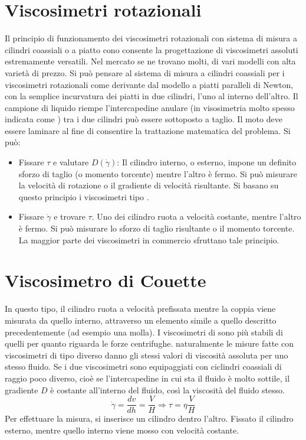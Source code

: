 \section{Viscosimetri rotazionali}
Il principio di funzionamento dei viscosimetri rotazionali con sistema di misura a cilindri coassiali o a piatto cono consente la progettazione di viscosimetri assoluti estremamente versatili.
Nel mercato se ne trovano molti, di vari modelli con alta varietà di prezzo.
Si può pensare al sistema di misura a cilindri coassiali per i viscosimetri rotazionali come derivante dal modello a piatti paralleli di Newton, con la semplice incurvatura dei piatti in due cilindri, l'uno al interno dell'altro. Il campione di liquido riempe l'intercapedine anulare (in visosimetria molto spesso indicata come ) tra i due cilindri può essere sottoposto a taglio. Il moto deve essere laminare al fine di consentire la trattazione matematica del problema.
Si può:
\begin{itemize}
\item Fissare $\tau$ e valutare $D(\dot{\gamma})$: Il cilindro interno, o esterno, impone un definito sforzo di taglio (o momento torcente) mentre l'altro è fermo.
Si può misurare la velocità di rotazione o il gradiente di velocità risultante. Si basano su questo principio i viscosimetri tipo .
\item Fissare $\dot{\gamma}$ e trovare $\tau$.
Uno dei cilindro ruota a velocità costante, mentre l'altro è fermo. Si può misurare lo sforzo di taglio risultante o il momento torcente. La maggior parte dei viscosimetri in commercio sfruttano tale principio.
\end{itemize}

\section{Viscosimetro di Couette}
In questo tipo, il cilindro ruota a velocità prefissata mentre la coppia viene misurata da quello interno, attraverso un elemento simile a quello descritto precedentemente (ad esempio una molla).
I viscosimetri di  sono più stabili di quelli  per quanto riguarda le forze centrifughe. naturalmente le misure fatte con viscosimetri di tipo diverso danno gli stessi valori di viscosità assoluta per uno stesso fluido.
Se i due viscosimetri sono equipaggiati con ciclindri coassiali di raggio poco diverso, cioè se l'intercapedine in cui sta il fluido è molto sottile, il gradiente $D$ è costante all'interno del fluido, così la viscosità del fluido stesso.
\begin{equation}
\dot{\gamma} = \frac{dv}{dh} = \frac{V}{H} \Rightarrow \tau = \eta \frac{V}{H}
\end{equation}
Per effettuare la misura, si inserisce un cilindro dentro l'altro. Fissato il cilindro esterno, mentre quello interno viene mosso con velocità costante.

